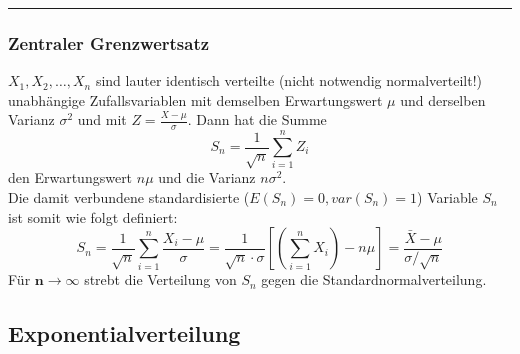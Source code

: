 \hrule
	
\subsubsection{Zentraler Grenzwertsatz}
$X_1, X_2, \ldots , X_n$ sind lauter identisch verteilte (nicht notwendig normalverteilt!)
unabhängige Zufallsvariablen mit demselben Erwartungswert $\mu$ und derselben Varianz $\sigma^2$
und mit $Z = \frac{X-\mu}{\sigma}$. Dann hat die Summe
\begin{equation}
	S_n = \frac{1}{\sqrt{n}}\sum_{i=1}^n Z_i \nonumber
\end{equation}
den Erwartungswert $n \mu$ und die Varianz $n \sigma^2$.\\
Die damit verbundene standardisierte ($E(S_n) = 0, var(S_n) = 1$) Variable $S_n$ ist somit wie
folgt definiert: \\ 
\begin{equation}
	S_n = \frac{1}{\sqrt{n}}\sum_{i=1}^n \frac{X_i - \mu}{\sigma}
	= \frac{1}{\sqrt{n}\cdot \sigma}\left[\left(\sum\limits_{i=1}^n X_i\right) -n \mu\right]
	=\dfrac{\bar{X} - \mu}{\sigma / \sqrt{n}} \nonumber
\end{equation}
Für $\boldsymbol{n \to \infty}$ strebt die Verteilung von $S_n$ gegen die
Standardnormalverteilung. \\


\subsection{Exponentialverteilung}

